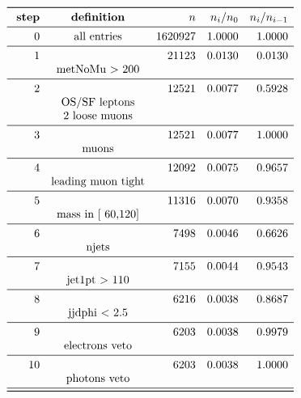 \documentclass[11pt,a4paper]{article}
\begin{document}
\begin{table}
\caption{\emph{Entries after each selection step, normalised to 5.00 $fb^{-1}$; n is the number of entries after the i-th selection step; Note that cuts on second jet are applied only if a second jet exists with $p_t$ > 30\,GeV.}}
\[
\begin{array}{rcrrr}
\toprule
\ \textbf{step}& \textbf{definition}  & n  &  n_i/n_0 & n_i/n_{i-1}  \\ 
\midrule
 0  & \text{all entries} & 1620927 & 1.0000 & 1.0000 \\
\midrule
 1  & &  21123 & 0.0130 & 0.0130 \\
& \text{metNoMu > 200} & & & \\
\midrule
 2  & &  12521 & 0.0077 & 0.5928 \\
& \text{OS/SF leptons} & & & \\
& \text{2 loose muons} & & & \\
\midrule
 3  & &  12521 & 0.0077 & 1.0000 \\
& \text{muons} & & & \\
\midrule
 4  & &  12092 & 0.0075 & 0.9657 \\
& \text{leading muon tight} & & & \\
\midrule
 5  & &  11316 & 0.0070 & 0.9358 \\
& \text{mass in [ 60,120]} & & & \\
\midrule
 6  & &   7498 & 0.0046 & 0.6626 \\
& \text{njets} & & & \\
\midrule
 7  & &   7155 & 0.0044 & 0.9543 \\
& \text{jet1pt >  110} & & & \\
\midrule
 8  & &   6216 & 0.0038 & 0.8687 \\
& \text{jjdphi < 2.5} & & & \\
\midrule
 9  & &   6203 & 0.0038 & 0.9979 \\
& \text{electrons veto} & & & \\
\midrule
 10  & &   6203 & 0.0038 & 1.0000 \\
& \text{photons veto} & & & \\
\midrule
\bottomrule
\end{array}
\]
\end{table}
\end{document}
